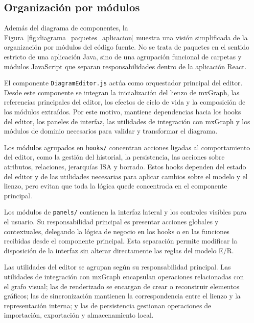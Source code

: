 \subsection{Organización por módulos}

Además del diagrama de componentes, la Figura~\ref{fig:diagrama_paquetes_aplicacion} muestra una visión simplificada de la organización por módulos del código fuente. No se trata de paquetes en el sentido estricto de una aplicación Java, sino de una agrupación funcional de carpetas y módulos JavaScript que separan responsabilidades dentro de la aplicación React.


El componente \texttt{DiagramEditor.js} actúa como orquestador principal del editor. Desde este componente se integran la inicialización del lienzo de mxGraph, las referencias principales del editor, los efectos de ciclo de vida y la composición de los módulos extraídos. Por este motivo, mantiene dependencias hacia los hooks del editor, los paneles de interfaz, las utilidades de integración con mxGraph y los módulos de dominio necesarios para validar y transformar el diagrama.

Los módulos agrupados en \texttt{hooks/} concentran acciones ligadas al comportamiento del editor, como la gestión del historial, la persistencia, las acciones sobre atributos, relaciones, jerarquías ISA y borrado. Estos hooks dependen del estado del editor y de las utilidades necesarias para aplicar cambios sobre el modelo y el lienzo, pero evitan que toda la lógica quede concentrada en el componente principal.

Los módulos de \texttt{panels/} contienen la interfaz lateral y los controles visibles para el usuario. Su responsabilidad principal es presentar acciones globales y contextuales, delegando la lógica de negocio en los hooks o en las funciones recibidas desde el componente principal. Esta separación permite modificar la disposición de la interfaz sin alterar directamente las reglas del modelo E/R.

Las utilidades del editor se agrupan según su responsabilidad principal. Las utilidades de integración con mxGraph encapsulan operaciones relacionadas con el grafo visual; las de renderizado se encargan de crear o reconstruir elementos gráficos; las de sincronización mantienen la correspondencia entre el lienzo y la representación interna; y las de persistencia gestionan operaciones de importación, exportación y almacenamiento local.

